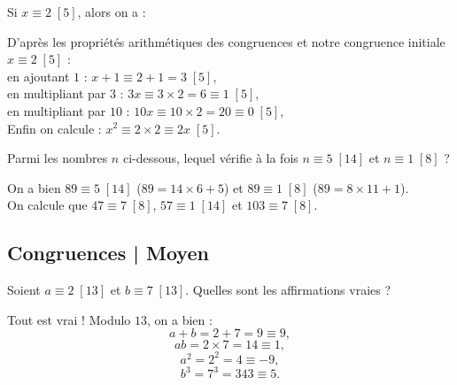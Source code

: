 \begin{question}
 Si $x \equiv 2 \; [5]$, alors on a :
    \begin{answers} 
    \end{answers}
    \begin{explanations} 
    D'après les propriétés arithmétiques des congruences et notre congruence initiale $x \equiv 2 \;[5]$ :\\
    en ajoutant $1$ : $x+1 \equiv 2+1 = 3 \; [5]$,\\
    en multipliant par $3$ : $3x \equiv 3 \times 2 = 6 \equiv 1 \;[5]$,\\
    en multipliant par $10$ : $10x \equiv 10 \times 2 = 20 \equiv 0 \;[5]$,\\
    Enfin on calcule : $x^2 \equiv 2 \times 2 \equiv 2x \;[5]$.
    \end{explanations}
\end{question}


\begin{question}
    Parmi les nombres $n$ ci-dessous, lequel vérifie à la fois $n \equiv 5 \;[14]$ et $n \equiv 1 \;[8]$ ?
    \begin{answers} 
    \end{answers}
    \begin{explanations} 
        On a bien $89 \equiv 5 \;[14]$ ($89 = 14 \times 6 + 5$) et $89 \equiv 1 \; [8]$ ($89 = 8 \times 11 + 1$).\\
        On calcule que $47 \equiv 7 \;[8]$, $57 \equiv 1 \; [14]$ et $103 \equiv 7 \;[8]$.
    \end{explanations}
\end{question}



\subsection{Congruences | Moyen}


\begin{question}
     Soient $a\equiv 2 \;[13]$ et $b \equiv 7 \; [13]$.
    Quelles sont les affirmations vraies ?
    \begin{answers}
    \end{answers}
    \begin{explanations} 
        Tout est vrai ! Modulo $13$, on a bien : 
        $$a+b = 2+7 = 9 \equiv 9,$$
        $$ab = 2 \times 7 = 14 \equiv 1,$$
        $$a^2 = 2^2 = 4 \equiv -9,$$
        $$b^3 = 7^3 = 343 \equiv 5.$$
    \end{explanations}
\end{question}


